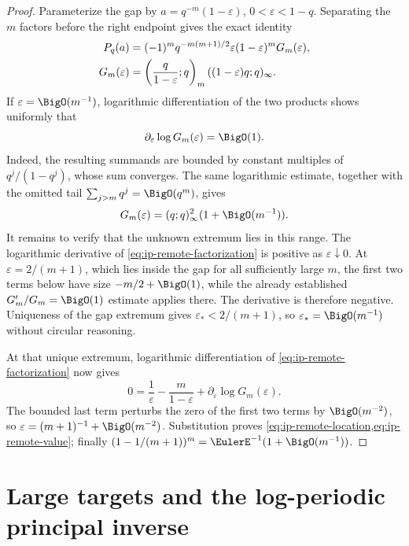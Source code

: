\begin{proof}
Parameterize the gap by \(a=q^{-m}(1-\varepsilon)\),
\(0<\varepsilon<1-q\).  Separating the \(m\) factors before the right endpoint
gives the exact identity
\begin{align}
 P_q(a)
 &=(-1)^mq^{-m(m+1)/2}
 \varepsilon(1-\varepsilon)^mG_m(\varepsilon),
 \label{eq:ip-remote-factorization}\\
 G_m(\varepsilon)
 &=\left(\frac q{1-\varepsilon};q\right)_m
 ((1-\varepsilon)q;q)_\infty.
 \notag
\end{align}
If \(\varepsilon=\BigO(m^{-1})\), logarithmic differentiation of the two
products shows uniformly that
\[
 \partial_\varepsilon\log G_m(\varepsilon)=\BigO(1).
\]
Indeed, the resulting summands are bounded by constant multiples of
\(q^j/(1-q^j)\), whose sum converges.  The same logarithmic estimate, together
with the omitted tail \(\sum_{j>m}q^j=\BigO(q^m)\), gives
\[
 G_m(\varepsilon)=(q;q)_\infty^2(1+\BigO(m^{-1})).
\]
It remains to verify that the unknown extremum lies in this range.  The
logarithmic derivative of \cref{eq:ip-remote-factorization} is positive as
\(\varepsilon\downarrow0\).  At
\(\varepsilon=2/(m+1)\), which lies inside the gap for all sufficiently large
\(m\), the first two terms below have size \(-m/2+\BigO(1)\), while the
already established \(G_m'/G_m=\BigO(1)\) estimate applies there.  The
derivative is therefore negative.  Uniqueness of the gap extremum gives
\(\varepsilon_*<2/(m+1)\), so \(\varepsilon_*=\BigO(m^{-1})\) without
circular reasoning.

At that unique extremum, logarithmic differentiation of
\cref{eq:ip-remote-factorization} now gives
\[
 0=\frac1\varepsilon-\frac m{1-\varepsilon}
   +\partial_\varepsilon\log G_m(\varepsilon).
\]
The bounded last term perturbs the zero of the first two terms by
\(\BigO(m^{-2})\), so
\(\varepsilon=(m+1)^{-1}+\BigO(m^{-2})\).  Substitution proves
\cref{eq:ip-remote-location,eq:ip-remote-value}; finally
\((1-1/(m+1))^m=\EulerE^{-1}(1+\BigO(m^{-1}))\).
\end{proof}

\section{Large targets and the log-periodic principal inverse}
\label{sec:ip-log-periodic}

